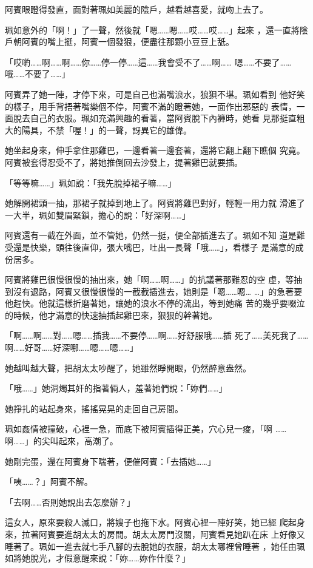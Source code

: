 阿賓眼瞪得發直，面對著珮如美麗的陰戶，越看越喜愛，就吻上去了。

珮如意外的「啊！」了一聲，然後就「嗯……嗯……哎……哎……」起來
，還一直將陰戶朝阿賓的嘴上挺，阿賓一個發狠，便盡往那顆小豆豆上舐。

「哎喲……啊……啊……你……停一停……這……我會受不了……啊……
嗯……不要了……哦……不要了……」

阿賓弄了她一陣，才停下來，可是自己也滿嘴浪水，狼狽不堪。珮如看到
他好笑的樣子，用手背捂著嘴樂個不停，阿賓不滿的瞪著她，一面作出邪惡的
表情，一面脫去自己的衣服。珮如充滿興趣的看著，當阿賓脫下內褲時，她看
見那挺直粗大的陽具，不禁「喔！」的一聲，訝異它的雄偉。

她坐起身來，伸手拿住那雞巴，一邊看著一邊套著，還將它翻上翻下瞧個
究竟。阿賓被套得忍受不了，將她推倒回去沙發上，提著雞巴就要插。

「等等嘛……」珮如說：「我先脫掉裙子嘛……」

她解開裙頭一抽，那裙子就掉到地上了。阿賓將雞巴對好，輕輕一用力就
滑進了一大半，珮如雙眉緊鎖，擔心的說：「好深啊……」

阿賓還有一截在外面，並不管她，仍然一挺，便全部插進去了。珮如不知
道是難受還是快樂，頭往後直仰，張大嘴巴，吐出一長聲「哦……」，看樣子
是滿意的成份居多。

阿賓將雞巴很慢很慢的抽出來，她「啊……啊……」的抗議著那難忍的空
虛，等抽到沒有退路，阿賓又很慢很慢的一截截插進去，她則是「嗯……嗯…
…」的急著要他趕快。他就這樣折磨著她，讓她的浪水不停的流出，等到她痛
苦的幾乎要啜泣的時候，他才滿意的快速抽插起雞巴來，狠狠的幹著她。

「啊……啊……對……嗯……插我……不要停……啊……好舒服哦……插
死了……美死我了……啊……好哥……好深哪……嗯……嗯……」

她越叫越大聲，把胡太太吵醒了，她雖然睜開眼，仍然醉意盎然。

「哦……」她洞燭其奸的指著倆人，羞著她們說：「妳們……」

她掙扎的站起身來，搖搖晃晃的走回自己房間。

珮如姦情被撞破，心裡一急，而底下被阿賓插得正美，穴心兒一痠，「啊
……啊……」的尖叫起來，高潮了。

她剛完蛋，還在阿賓身下喘著，便催阿賓：「去插她……」

「咦……？」阿賓不解。

「去啊……否則她說出去怎麼辦？」

這女人，原來要殺人滅口，將嫂子也拖下水。阿賓心裡一陣好笑，她已經
爬起身來，拉著阿賓要進胡太太的房間。胡太太房門沒關，阿賓看見她趴在床
上好像又睡著了。珮如一進去就七手八腳的去脫她的衣服，胡太太哪裡曾睡著
，她任由珮如將她脫光，才假意醒來說：「妳……妳作什麼？」

